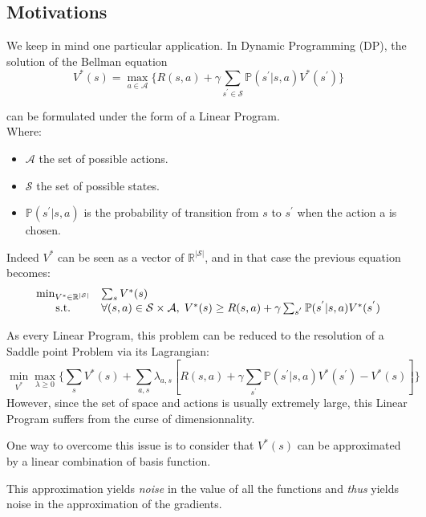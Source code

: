 \documentclass[10pt]{article}
\begin{document}
\subsection{Motivations}

We keep in mind one particular application.
In Dynamic Programming (DP), the solution of the Bellman equation
$$
V^{*}(s) = \max_{a \in \mathcal{A}} \{ R(s,a) + \gamma \sum_{s^{'} \in \mathcal{S}} \mathbb{P}(s^{'} | s,a)V^{*}(s^{'}) \}
$$

can be formulated under the form of a Linear Program.\\

Where:
\begin{itemize}
\item $\mathcal{A}$ the set of possible actions.
\item $\mathcal{S}$ the set of possible states.
\item $\mathbb{P}(s^{'} | s,a)$ is the probability of transition from $s$ to $s^{'}$ when the action a is chosen.
\end{itemize}



Indeed $V^{*}$ can be seen as a vector of $\mathbb{R}^{|\mathcal{S}|}$, and in that case the previous equation becomes:
\begin{equation}\label{MLSDP}
\begin{array}{cl}
\min_{V^{*} \in \mathbb{R}^{|\mathcal{S}|}} & \sum_{s} V^{*}(s)  \\
\text{s.t.} & \forall (s, a)\in \mathcal{S} \times \mathcal{A}, \hspace{0.1cm} V^{*}(s) \geq R(s,a) + \gamma \sum_{s^{'}}\mathbb{P}(s^{'}| s,a )V^{*}(s^{'})\\
\end{array}
\end{equation}

As every Linear Program, this problem can be reduced to the resolution of a Saddle point Problem via its Lagrangian:
$$
\min_{V^{*}}\max_{\lambda \geq 0}\{ \sum_{s} V^{*}(s) + \sum_{a,s}\lambda_{a,s}[R(s,a) + \gamma \sum_{s^{'}}\mathbb{P}(s^{'}| s,a )V^{*}(s^{'}) - V^{*}(s)] \}
$$
However, since the set of space and actions is usually extremely large, this Linear Program suffers from the curse of dimensionnality.

One way to overcome this issue is to consider that $V^{*}(s)$ can be approximated by a linear combination of basis function.

This approximation yields \emph{noise} in the value of all the functions and \emph{thus} yields noise in the approximation of the gradients.
\end{document}

